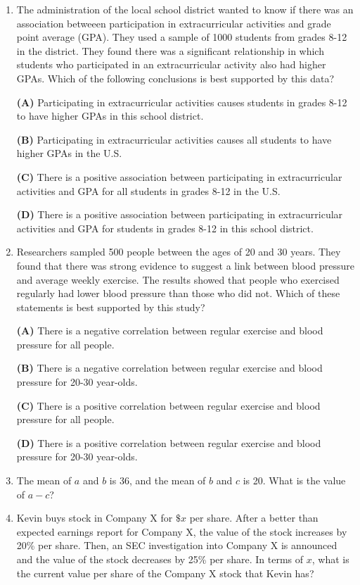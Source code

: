 \documentclass[../satmath.tex]{subfiles}
\begin{document}
\begin{enumerate}[label=\bfseries\arabic*.]
\item The administration of the local school district wanted to know if there was an association betweeen participation in extracurricular activities and 
grade point average (GPA). They used a sample of 1000 students from grades 8-12 in the district. They found there was a significant relationship in which 
students who participated in an extracurricular activity also had higher GPAs. Which of the following conclusions is best supported by this data?

\textbf{(A) } Participating in extracurricular activities causes students in grades 8-12 to have higher GPAs in this school district.

\textbf{(B) } Participating in extracurricular activities causes all students to have higher GPAs in the U.S.

\textbf{(C) } There is a positive association between participating in extracurricular activities and GPA for all students in grades 8-12 in the U.S.

\textbf{(D) } There is a positive association between participating in extracurricular activities and GPA for students in grades 8-12 in this school district. 

\item Researchers sampled 500 people between the ages of 20 and 30 years. They found that there was strong evidence to suggest a link between blood 
pressure and average weekly exercise. The results showed that people who exercised regularly had lower blood pressure than those who did not. Which of these 
statements is best supported by this study?

\textbf{(A) } There is a negative correlation between regular exercise and blood pressure for all people.

\textbf{(B) } There is a negative correlation between regular exercise and blood pressure for 20-30 year-olds.

\textbf{(C) } There is a positive correlation between regular exercise and blood pressure for all people.

\textbf{(D) } There is a positive correlation between regular exercise and blood pressure for 20-30 year-olds.
 

\item The mean of $a$ and $b$ is 36, and the mean of $b$ and $c$ is 20. What is the value of $a-c$?

\item Kevin buys stock in Company X for $\$x$ per share. After a better than expected earnings report for Company X, the value of the stock 
increases by 20\% per share. Then, an SEC investigation into Company X is announced and the value of the stock decreases by 25\% per share. 
In terms of $x$, what is the current value per share of the Company X stock that Kevin has?


\end{enumerate}
\end{document}
